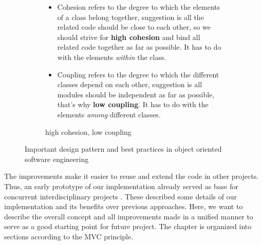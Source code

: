 \begin{figure}
\begin{subfigure}[b]{0.68\textwidth}
\begin{small}
\begin{ssfont}
\begin{itemize}
\item Cohesion refers to the degree to which the elements of a class belong together, suggestion is all the related code should be close to each other, so we should strive for \textbf{high cohesion} and bind all related code together as far as possible. It has to do with the elements \textit{within} the class. %
\item Coupling refers to the degree to which the different classes depend on each other, suggestion is all modules should be independent as far as possible, that's why \textbf{low coupling}. It has to do with the elements \textit{among} different classes. %
\end{itemize}
\end{ssfont}
\end{small}
\caption{high cohesion, low coupling\footnotemark}
\label{fig:coh}
\end{subfigure}
\caption{Important design pattern and best practices in object oriented software engineering}
\label{fig:patterns}
\end{figure}

%

The improvements make it easier to reuse and extend the code in other projects. Thus, an early prototype of our implementation already served as base for concurrent interdisciplinary projects \cite{fischer2016idp,feil2016idp}. These described some details of our implementation and its benefits over previous approaches. Here, we want to describe the overall concept and all improvements made in a unified manner to serve as a good starting point for future project. The chapter is organized into sections according to the MVC principle.

